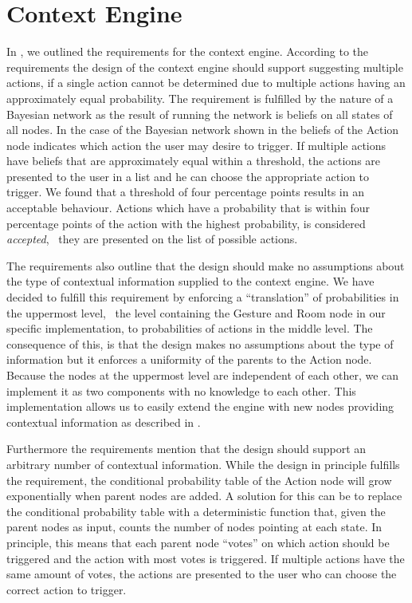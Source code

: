 \section{Context Engine}
\label{sec:design:context-engine}

In , we outlined the requirements for the context engine. According to the requirements the design of the context engine should support suggesting multiple actions, if a single action cannot be determined due to multiple actions having an approximately equal probability. The requirement is fulfilled by the nature of a Bayesian network as the result of running the network is beliefs on all states of all nodes. In the case of the Bayesian network shown in  the beliefs of the Action node indicates which action the user may desire to trigger.
If multiple actions have beliefs that are approximately equal within a threshold, the actions are presented to the user in a list and he can choose the appropriate action to trigger. We found that a threshold of four percentage points results in an acceptable behaviour. Actions which have a probability that is within four percentage points of the action with the highest probability, is considered \emph{accepted}, \ie~they are presented on the list of possible actions.

The requirements also outline that the design should make no assumptions about the type of contextual information supplied to the context engine. We have decided to fulfill this requirement by enforcing a ``translation'' of probabilities in the uppermost level, \ie~the level containing the Gesture and Room node in our specific implementation, to probabilities of actions in the middle level.
The consequence of this, is that the design makes no assumptions about the type of information but it enforces a uniformity of the parents to the Action node.
Because the nodes at the uppermost level are independent of each other, we can implement it as two components with no knowledge to each other. This implementation allows us to easily extend the engine with new nodes providing contextual information as described in .

Furthermore the requirements mention that the design should support an arbitrary number of contextual information. While the design in principle fulfills the requirement, the conditional probability table of the Action node will grow exponentially when parent nodes are added.
A solution for this can be to replace the conditional probability table with a deterministic function that, given the parent nodes as input, counts the number of nodes pointing at each state. In principle, this means that each parent node ``votes'' on which action should be triggered and the action with most votes is triggered. If multiple actions have the same amount of votes, the actions are presented to the user who can choose the correct action to trigger.

